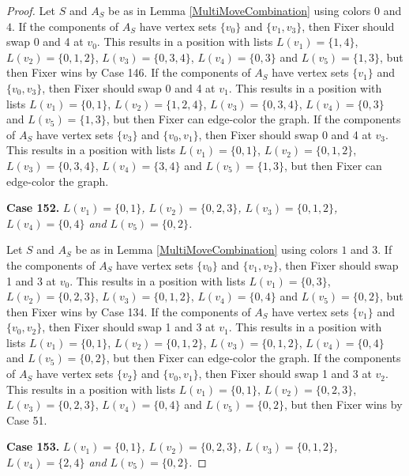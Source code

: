 \documentclass[12pt]{amsart}
\theoremstyle{plain}
\theoremstyle{definition}
\theoremstyle{remark}
\begin{document}
\begin{proof}
Let $S$ and $A_S$ be as in Lemma \ref{MultiMoveCombination} using colors $0$ and $4$. If the components of $A_S$ have vertex sets $\{v_0\}$ and $\{v_1, v_3\}$, then Fixer should swap 0 and 4 at $v_0$. This results in a position with lists $L(v_1) = \{1, 4\}$, $L(v_2) = \{0, 1, 2\}$, $L(v_3) = \{0, 3, 4\}$, $L(v_4) = \{0, 3\}$ and $L(v_5) = \{1, 3\}$, but then Fixer wins by Case 146.
If the components of $A_S$ have vertex sets $\{v_1\}$ and $\{v_0, v_3\}$, then Fixer should swap 0 and 4 at $v_1$. This results in a position with lists $L(v_1) = \{0, 1\}$, $L(v_2) = \{1, 2, 4\}$, $L(v_3) = \{0, 3, 4\}$, $L(v_4) = \{0, 3\}$ and $L(v_5) = \{1, 3\}$, but then Fixer can edge-color the graph.
If the components of $A_S$ have vertex sets $\{v_3\}$ and $\{v_0, v_1\}$, then Fixer should swap 0 and 4 at $v_3$. This results in a position with lists $L(v_1) = \{0, 1\}$, $L(v_2) = \{0, 1, 2\}$, $L(v_3) = \{0, 3, 4\}$, $L(v_4) = \{3, 4\}$ and $L(v_5) = \{1, 3\}$, but then Fixer can edge-color the graph.

\noindent\textbf{Case 152.  }\textit{$L(v_1) = \{0, 1\}$, $L(v_2) = \{0, 2, 3\}$, $L(v_3) = \{0, 1, 2\}$, $L(v_4) = \{0, 4\}$ and $L(v_5) = \{0, 2\}$.}

Let $S$ and $A_S$ be as in Lemma \ref{MultiMoveCombination} using colors $1$ and $3$. If the components of $A_S$ have vertex sets $\{v_0\}$ and $\{v_1, v_2\}$, then Fixer should swap 1 and 3 at $v_0$. This results in a position with lists $L(v_1) = \{0, 3\}$, $L(v_2) = \{0, 2, 3\}$, $L(v_3) = \{0, 1, 2\}$, $L(v_4) = \{0, 4\}$ and $L(v_5) = \{0, 2\}$, but then Fixer wins by Case 134.
If the components of $A_S$ have vertex sets $\{v_1\}$ and $\{v_0, v_2\}$, then Fixer should swap 1 and 3 at $v_1$. This results in a position with lists $L(v_1) = \{0, 1\}$, $L(v_2) = \{0, 1, 2\}$, $L(v_3) = \{0, 1, 2\}$, $L(v_4) = \{0, 4\}$ and $L(v_5) = \{0, 2\}$, but then Fixer can edge-color the graph.
If the components of $A_S$ have vertex sets $\{v_2\}$ and $\{v_0, v_1\}$, then Fixer should swap 1 and 3 at $v_2$. This results in a position with lists $L(v_1) = \{0, 1\}$, $L(v_2) = \{0, 2, 3\}$, $L(v_3) = \{0, 2, 3\}$, $L(v_4) = \{0, 4\}$ and $L(v_5) = \{0, 2\}$, but then Fixer wins by Case 51.

\noindent\textbf{Case 153.  }\textit{$L(v_1) = \{0, 1\}$, $L(v_2) = \{0, 2, 3\}$, $L(v_3) = \{0, 1, 2\}$, $L(v_4) = \{2, 4\}$ and $L(v_5) = \{0, 2\}$.}


\end{proof}
\end{document}
